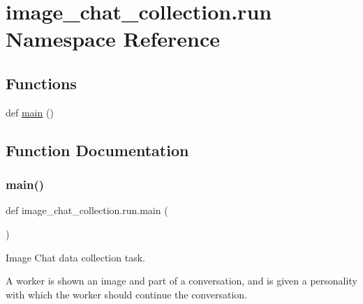 \hypertarget{namespaceimage__chat__collection_1_1run}{}\section{image\+\_\+chat\+\_\+collection.\+run Namespace Reference}
\label{namespaceimage__chat__collection_1_1run}
\subsection*{Functions}
\begin{DoxyCompactItemize}
\item 
def \hyperlink{namespaceimage__chat__collection_1_1run_a703a00a419d81661c189b6603ab72769}{main} ()
\end{DoxyCompactItemize}


\subsection{Function Documentation}
\mbox{\label{namespaceimage__chat__collection_1_1run_a703a00a419d81661c189b6603ab72769}} 
\subsubsection{\texorpdfstring{main()}{main()}}
{\footnotesize\ttfamily def image\+\_\+chat\+\_\+collection.\+run.\+main (\begin{DoxyParamCaption}{ }\end{DoxyParamCaption})}

\begin{DoxyVerb}Image Chat data collection task.

A worker is shown an image and part of a conversation, and is given a personality
with which the worker should continue the conversation.
\end{DoxyVerb}
 